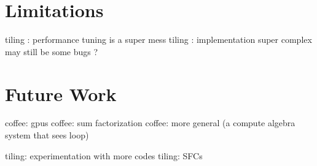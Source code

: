 \section{Limitations}

tiling : performance tuning is a super mess
tiling : implementation super complex may still be some bugs ?

\section{Future Work}

coffee: gpus
coffee: sum factorization
coffee: more general (a compute algebra system that sees loop)

tiling: experimentation with more codes
tiling: SFCs